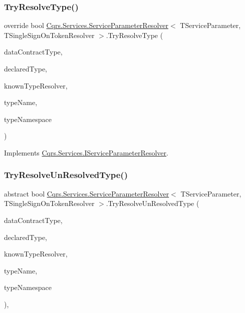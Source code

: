 \subsubsection{\texorpdfstring{Try\+Resolve\+Type()}{TryResolveType()}}
{\footnotesize\ttfamily override bool \hyperlink{classCqrs_1_1Services_1_1ServiceParameterResolver}{Cqrs.\+Services.\+Service\+Parameter\+Resolver}$<$ T\+Service\+Parameter, T\+Single\+Sign\+On\+Token\+Resolver $>$.Try\+Resolve\+Type (\begin{DoxyParamCaption}\item[{Type}]{data\+Contract\+Type,  }\item[{Type}]{declared\+Type,  }\item[{Data\+Contract\+Resolver}]{known\+Type\+Resolver,  }\item[{out Xml\+Dictionary\+String}]{type\+Name,  }\item[{out Xml\+Dictionary\+String}]{type\+Namespace }\end{DoxyParamCaption})}



Implements \hyperlink{interfaceCqrs_1_1Services_1_1IServiceParameterResolver_a31c82a00b192b877faff6df99e1b689b}{Cqrs.\+Services.\+I\+Service\+Parameter\+Resolver}.

\mbox{\label{classCqrs_1_1Services_1_1ServiceParameterResolver_a943e9bb30a085ba6783f6f8a2aa73315}} 
\subsubsection{\texorpdfstring{Try\+Resolve\+Un\+Resolved\+Type()}{TryResolveUnResolvedType()}}
{\footnotesize\ttfamily abstract bool \hyperlink{classCqrs_1_1Services_1_1ServiceParameterResolver}{Cqrs.\+Services.\+Service\+Parameter\+Resolver}$<$ T\+Service\+Parameter, T\+Single\+Sign\+On\+Token\+Resolver $>$.Try\+Resolve\+Un\+Resolved\+Type (\begin{DoxyParamCaption}\item[{Type}]{data\+Contract\+Type,  }\item[{Type}]{declared\+Type,  }\item[{Data\+Contract\+Resolver}]{known\+Type\+Resolver,  }\item[{ref Xml\+Dictionary\+String}]{type\+Name,  }\item[{ref Xml\+Dictionary\+String}]{type\+Namespace }\end{DoxyParamCaption})\hspace{0.3cm}{\ttfamily [protected]}, {}}



